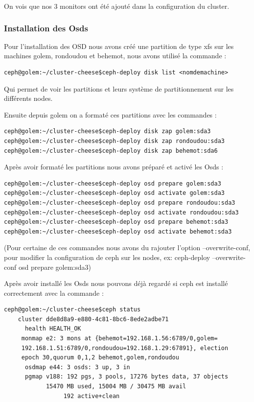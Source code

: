 \documentclass[12pt]{article}
\begin{document}
On vois que nos 3 monitors ont été ajouté dans la configuration du cluster.

\subsubsection{Installation des Osds}

Pour l'installation des OSD nous avons créé une partition de type xfs sur les machines golem, rondoudou et behemot, nous avons utilisé la commande :
\begin{verbatim}
ceph@golem:~/cluster-cheese$ceph-deploy disk list <nomdemachine>
\end{verbatim}

Qui permet de voir les partitions et leurs système de partitionnement sur les différents nodes.

Ensuite depuis golem on a formaté ces partitions avec les commandes :
\begin{verbatim}
ceph@golem:~/cluster-cheese$ceph-deploy disk zap golem:sda3
ceph@golem:~/cluster-cheese$ceph-deploy disk zap rondoudou:sda3
ceph@golem:~/cluster-cheese$ceph-deploy disk zap behemot:sda6
\end{verbatim}

Après avoir formaté les partitions nous avons préparé et activé les Osds :
\begin{verbatim}
ceph@golem:~/cluster-cheese$ceph-deploy osd prepare golem:sda3
ceph@golem:~/cluster-cheese$ceph-deploy osd activate golem:sda3
ceph@golem:~/cluster-cheese$ceph-deploy osd prepare rondoudou:sda3
ceph@golem:~/cluster-cheese$ceph-deploy osd activate rondoudou:sda3
ceph@golem:~/cluster-cheese$ceph-deploy osd prepare behemot:sda3
ceph@golem:~/cluster-cheese$ceph-deploy osd activate behemot:sda3
\end{verbatim}

(Pour certaine de ces commandes nous avons du rajouter l'option --overwrite-conf, pour modifier la configuration de ceph sur les nodes, 
ex: ceph-deploy --overwrite-conf osd prepare golem:sda3)

Après avoir installé les Osds nous pouvons déjà regardé si ceph est installé correctement avec la commande :
\begin{verbatim}
ceph@golem:~/cluster-cheese$ceph status     
    cluster dde8d8a9-e880-4c81-8bc6-8ede2adbe71
      health HEALTH_OK  
     monmap e2: 3 mons at {behemot=192.168.1.56:6789/0,golem=
     192.168.1.51:6789/0,rondoudou=192.168.1.29:67891}, election 
     epoch 30,quorum 0,1,2 behemot,golem,rondoudou 
      osdmap e44: 3 osds: 3 up, 3 in 
      pgmap v188: 192 pgs, 3 pools, 17276 bytes data, 37 objects 
            15470 MB used, 15004 MB / 30475 MB avail 
                 192 active+clean 
\end{verbatim}
\end{document}
